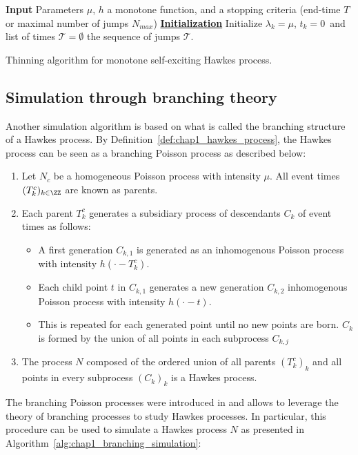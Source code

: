 \begin{algorithm}[!ht]
    \SetAlgoLined
     \textbf{Input} Parameters $\mu$, $h$ a monotone function, and a stopping criteria (end-time $T$ or maximal number of jumps $N_{max}$)\;
     \textbf{\underline{Initialization}} Initialize $\lambda_k =\mu$, $t_k=0$\ and list of times $\mathcal{T} = \emptyset$\;
     \Return the sequence of jumps $\mathcal{T}$.
     \caption{Thinning algorithm for monotone self-exciting Hawkes process.}
     \label{alg:chap1_ogata_simulation}
\end{algorithm}

\subsection{Simulation through branching theory}

Another simulation algorithm is based on what is called the branching structure of a Hawkes process.
By Definition~\ref{def:chap1_hawkes_process}, the Hawkes process can be seen as a branching Poisson process as described below:
\begin{enumerate}
    \item Let $N_c$ be a homogeneous Poisson process with intensity $\mu$. All event times $(T_k^c)_{k\in\ZZ}$ are known as parents.
    \item Each parent $T_k^c$ generates a subsidiary process of descendants $C_k$ of event times as follows:
    \begin{itemize}
        \item A first generation $C_{k,1}$ is generated as an inhomogenous Poisson process with intensity $h(\cdot - T_k^c)$.
        \item Each child point $t$ in $C_{k,1}$ generates a new generation $C_{k,2}$ inhomogenous Poisson process with intensity $h(\cdot - t)$.
        \item This is repeated for each generated point until no new points are born. 
        $C_k$ is formed by the union of all points in each subprocess $C_{k, j}$
    \end{itemize}
    \item The process $N$ composed of the ordered union of all parents $(T_k^c)_k$ and all points in every subprocess $(C_k)_{k}$ is a Hawkes process.
\end{enumerate}
The branching Poisson processes were introduced in \textcite{Bartlett1963, Lewis1964} and allows to leverage the theory of branching processes to study Hawkes processes.
In particular, this procedure can be used to simulate a Hawkes process $N$ as presented in Algorithm~\ref{alg:chap1_branching_simulation}:

